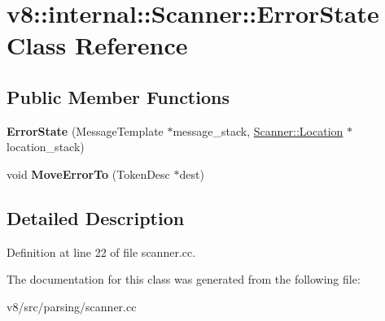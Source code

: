 \hypertarget{classv8_1_1internal_1_1Scanner_1_1ErrorState}{}\section{v8\+:\+:internal\+:\+:Scanner\+:\+:Error\+State Class Reference}
\label{classv8_1_1internal_1_1Scanner_1_1ErrorState}
\subsection*{Public Member Functions}
\begin{DoxyCompactItemize}
\item 
\mbox{\label{classv8_1_1internal_1_1Scanner_1_1ErrorState_a30895895ecd098f31f5b07258c622816}} 
{\bfseries Error\+State} (Message\+Template $\ast$message\+\_\+stack, \mbox{\hyperlink{structv8_1_1internal_1_1Scanner_1_1Location}{Scanner\+::\+Location}} $\ast$location\+\_\+stack)
\item 
\mbox{\label{classv8_1_1internal_1_1Scanner_1_1ErrorState_a72827ef43ef8057a19c3335c2b16afb1}} 
void {\bfseries Move\+Error\+To} (Token\+Desc $\ast$dest)
\end{DoxyCompactItemize}


\subsection{Detailed Description}


Definition at line 22 of file scanner.\+cc.



The documentation for this class was generated from the following file\+:\begin{DoxyCompactItemize}
\item 
v8/src/parsing/scanner.\+cc\end{DoxyCompactItemize}
